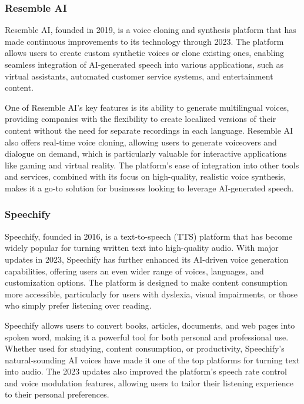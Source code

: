 \subsubsection{Resemble AI}

Resemble AI, founded in 2019, is a voice cloning and synthesis platform that has made continuous improvements to its technology through 2023. 
The platform allows users to create custom synthetic voices or clone existing ones, enabling seamless integration of AI-generated speech into various applications, such as virtual assistants, automated customer service systems, and entertainment content.

One of Resemble AI’s key features is its ability to generate multilingual voices, providing companies with the flexibility to create localized versions of their content without the need for separate recordings in each language. 
Resemble AI also offers real-time voice cloning, allowing users to generate voiceovers and dialogue on demand, which is particularly valuable for interactive applications like gaming and virtual reality. 
The platform’s ease of integration into other tools and services, combined with its focus on high-quality, realistic voice synthesis, makes it a go-to solution for businesses looking to leverage AI-generated speech.

\subsubsection{Speechify}

Speechify, founded in 2016, is a text-to-speech (TTS) platform that has become widely popular for turning written text into high-quality audio. 
With major updates in 2023, Speechify has further enhanced its AI-driven voice generation capabilities, offering users an even wider range of voices, languages, and customization options. 
The platform is designed to make content consumption more accessible, particularly for users with dyslexia, visual impairments, or those who simply prefer listening over reading.

Speechify allows users to convert books, articles, documents, and web pages into spoken word, making it a powerful tool for both personal and professional use. 
Whether used for studying, content consumption, or productivity, Speechify’s natural-sounding AI voices have made it one of the top platforms for turning text into audio. 
The 2023 updates also improved the platform’s speech rate control and voice modulation features, allowing users to tailor their listening experience to their personal preferences.

